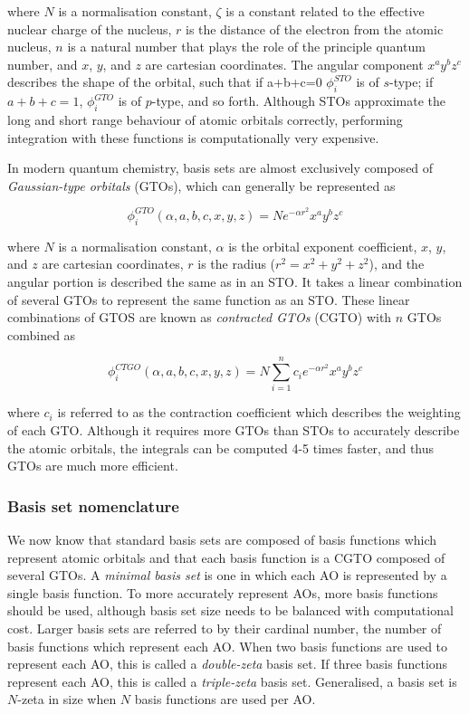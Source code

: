 \noindent where $N$ is a normalisation constant, $\zeta$ is a constant related
to the effective nuclear charge of the nucleus, $r$ is the distance of the
electron from the atomic nucleus, $n$ is a natural number that plays the role of
the principle quantum number, and $x$, $y$, and $z$ are cartesian coordinates.
The angular component $x^ay^bz^c$ describes the shape of the orbital, such that
if a+b+c=0 $\phi_i^{STO}$ is of $s$-type; if $a+b+c=1$, $\phi_i^{GTO}$ is of
$p$-type, and so forth. Although STOs approximate the long and short range
behaviour of atomic orbitals correctly, performing integration with these
functions is computationally very expensive.

In modern quantum chemistry, basis sets are almost exclusively composed of
\emph{Gaussian-type orbitals} (GTOs), which can generally be represented as

\begin{equation}
\phi_i^{GTO}(\alpha,a,b,c,x,y,z) = N e^{-\alpha r^2} x^ay^bz^c
\end{equation}

\noindent where $N$ is a normalisation constant, $\alpha$ is the orbital
exponent coefficient, $x$, $y$, and $z$ are cartesian coordinates, $r$ is the
radius ($r^2=x^2+y^2+z^2$), and the angular portion is described the same as in
an STO. It takes a linear combination of several GTOs to represent the same
function as an STO. These linear combinations of GTOS are known as
\emph{contracted GTOs} (CGTO) with $n$ GTOs combined as

\begin{equation}
\phi_i^{CTGO}(\alpha,a,b,c,x,y,z) = N \sum_{i=1}^n c_i e^{-\alpha r^2} x^ay^bz^c
\end{equation}

\noindent where $c_i$ is referred to as the contraction coefficient which
describes the weighting of each GTO. Although it requires more GTOs than STOs to
accurately describe the atomic orbitals, the integrals can be computed 4-5
times faster, and thus GTOs are much more efficient.\cite{Gill1994}

\subsubsection{Basis set nomenclature}

We now know that standard basis sets are composed of basis functions which
represent atomic orbitals and that each basis function is a CGTO composed of
several GTOs. A \emph{minimal basis set} is one in which each AO is represented
by a single basis function. To more accurately represent AOs, more basis
functions should be used, although basis set size needs to be balanced with
computational cost. Larger basis sets are referred to by their cardinal number,
the number of basis functions which represent each AO. When two basis functions
are used to represent each AO, this is called a \emph{double-zeta} basis set. If
three basis functions represent each AO, this is called a \emph{triple-zeta}
basis set. Generalised, a basis set is $N$-zeta in size when $N$ basis functions
are used per AO.

